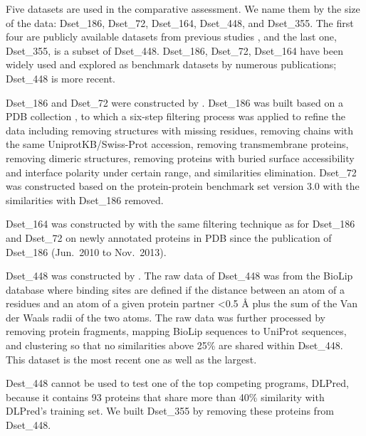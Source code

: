 Five datasets are used in the comparative assessment. We name them by the size of the data: Dset\_186, Dset\_72, Dset\_164, Dset\_448, and Dset\_355. The first four are publicly available datasets from previous studies \cite{murakami2010applying} \cite{dhole2014sequence} \cite{zhang2019scriber}, and the last one, Dset\_355, is a subset of Dset\_448. Dset\_186, Dset\_72, Dset\_164 have been widely used and explored as benchmark datasets by numerous publications; Dset\_448 is more recent.

Dset\_186 and Dset\_72 were constructed by \cite{murakami2010applying}. Dset\_186 was built based on a PDB collection \cite{berman2002protein}, to which a six-step filtering process was applied to refine the data including removing structures with missing residues, removing chains with the same UniprotKB/Swiss-Prot accession, removing transmembrane proteins, removing dimeric structures, removing proteins with buried surface accessibility and interface polarity under certain range, and similarities elimination. Dset\_72 was constructed based on the protein-protein benchmark set version 3.0 \cite{hwang2008protein} with the similarities with Dset\_186 removed.

Dset\_164 was constructed by \cite{dhole2014sequence} with the same filtering technique as for Dset\_186 and Dset\_72 on newly annotated proteins in PDB since the publication of Dset\_186 (Jun.~2010 to Nov.~2013). 

Dset\_448 was constructed by \cite{zhang2019scriber}. The raw data of Dset\_448 was from the BioLip database \cite{yang2012biolip} where binding sites are defined if the distance between an atom of a residues and an atom of a given protein partner <0.5 \AA{} plus the sum of the Van der Waals radii of the two atoms. The raw data was further processed by removing protein fragments, mapping BioLip sequences to UniProt sequences, and clustering so that no similarities above 25\% are shared within Dset\_448. This dataset is the most recent one as well as the largest. 

Dest\_448 cannot be used to test one of the top competing programs, DLPred, because it contains 93 proteins that share more than 40\% similarity with DLPred's training set. We built Dset\_355 by removing these proteins from Dset\_448.

